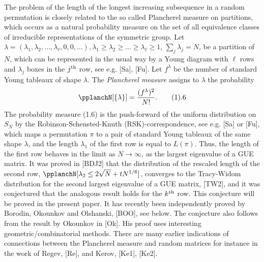 The problem of the length of the longest increasing subsequence in a
random permutation is closely related to the so called Plancherel
measure on partitions, which occurs as a natural probability measure
on the set of all equivalence classes of irreducible representations
of the symmetric group. Let
$\lambda=(\lambda_1,\lambda_2,\dots,\lambda_{\ell},0,0,\dots),
\lambda_1\ge\lambda_2\ge\dots\ge\lambda_{\ell}\ge 1$,
$\sum_j\lambda_j=N$, be a partition of $N$, which can be represented
in the usual way by a Young diagram with $\ell$ rows and $\lambda_j$
boxes in the $j^{\rm th}$ row, see e.g. [Sa], [Fu]. Let $f^\lambda$ be the
number of standard Young tableaux of shape $\lambda$. The {\it Plancherel
measure} assigns to $\lambda$ the probability
$$
\pplanchN[\{\lambda\}]=\frac{(f^\lambda)^2}{N!}.\tag 1.6
$$
The probability measure (1.6) is the push-forward of the uniform
distribution on $S_N$ by 
the Robinson-Schensted-Knuth (RSK)-correspondence, see
e.g. [Sa] or [Fu], which maps a permutation $\pi$ to a pair of
standard Young tableaux of the same shape $\lambda$, and 
the length $\lambda_1$ of the first row 
is equal to $L(\pi)$. Thus,
the length of the first row behaves in the limit as $N\to\infty$, as
the largest eigenvalue of a GUE matrix. It was proved in [BDJ2] that
the distribution of the rescaled length of the second row, $\pplanchN
[\lambda_2\le 2\sqrt{N}+tN^{1/6}]$, converges to the Tracy-Widom
distribution for the second largest eigenvalue of a GUE matrix, [TW2],
and it was conjectured that the analogous result holds for the $k^{\rm th}$
row. This conjecture will be proved in the present paper. It has
recently been independently proved by Borodin, Okounkov and Olshanski,
[BOO], see below. The conjecture also follows from the result by
Okounkov in [Ok]. His proof uses interesting geometric/combinatorial
methods. There are many earlier indications of connections between the
Plancherel measure and random matrices for instance in the work of
Regev, [Re], and Kerov, [Ke1], [Ke2].

